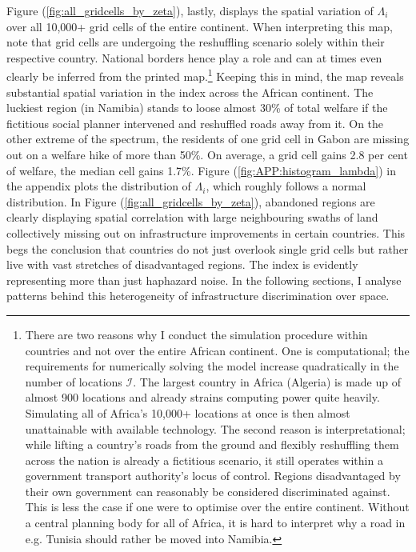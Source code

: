 \documentclass[11pt, oneside]{article}   	%
\let\oldref\ref
\renewcommand{\ref}[1]{(\oldref{#1})}
\begin{document}
Figure \ref{fig:all_gridcells_by_zeta}, lastly, displays the spatial variation of $\Lambda_{i}$ over all 10,000+ grid cells of the entire continent. When interpreting this map, note that grid cells are undergoing the reshuffling scenario solely within their respective country. National borders hence play a role and can at times even clearly be inferred from the printed map.\footnote{There are two reasons why I conduct the simulation procedure within countries and not over the entire African continent. One is computational; the requirements for numerically solving the model increase quadratically in the number of locations $\mathcal{I}$. The largest country in Africa (Algeria) is made up of almost 900 locations and already strains computing power quite heavily. Simulating all of Africa's 10,000+ locations at once is then almost unattainable with available technology. The second reason is interpretational; while lifting a country's roads from the ground and flexibly reshuffling them across the nation is already a fictitious scenario, it still operates within a government transport authority's locus of control. Regions disadvantaged by their own government can reasonably be considered discriminated against. This is less the case if one were to optimise over the entire continent. Without a central planning body for all of Africa, it is hard to interpret why a road in e.g. Tunisia should rather be moved into Namibia.}  Keeping this in mind, the map reveals substantial spatial variation in the index across the African continent. The luckiest region (in Namibia) stands to loose almost 30\% of total welfare if the fictitious social planner intervened and reshuffled roads away from it. On the other extreme of the spectrum, the residents of one grid cell in Gabon are missing out on a welfare hike of more than 50\%. On average, a grid cell gains 2.8 per cent of welfare, the median cell gains 1.7\%. Figure \ref{fig:APP:histogram_lambda} in the appendix plots the distribution of $\Lambda_{i}$, which roughly follows a normal distribution. In Figure \ref{fig:all_gridcells_by_zeta}, abandoned regions are clearly displaying spatial correlation with large neighbouring swaths of land collectively missing out on infrastructure improvements in certain countries. This begs the conclusion that countries do not just overlook single grid cells but rather live with vast stretches of disadvantaged regions. The index is evidently representing more than just haphazard noise. In the following sections, I analyse patterns behind this heterogeneity of infrastructure discrimination over space.
\end{document}
